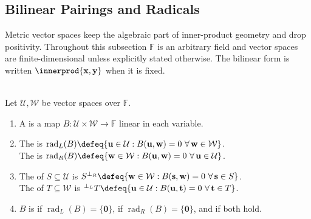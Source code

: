 \subsection{Bilinear Pairings and Radicals}\label{subsec:metric-vector-spaces-and-bilinear-forms}

%

Metric vector spaces keep the algebraic part of inner-product geometry and drop positivity. Throughout this subsection $\mathbb{F}$ is an arbitrary field and vector spaces are finite-dimensional unless explicitly stated otherwise. The bilinear form is written $\innerprod{\mathbf{x},\mathbf{y}}$ when it is fixed.

\begin{definition} \label{def:bilinear-pairing-left-right-radicals} \\
Let $\mathcal{U},\mathcal{W}$ be vector spaces over $\mathbb{F}$.
\begin{enumerate}[label=(\roman*)]
\setlength{\itemsep}{0pt}
\item A  is a map $B:\mathcal{U}\times\mathcal{W}\to\mathbb{F}$ linear in each variable.
\item The  is $\operatorname{rad}_L(B)\defeq\{\mathbf{u}\in\mathcal{U}:B(\mathbf{u},\mathbf{w})=0\ \forall\,\mathbf{w}\in\mathcal{W}\}$.\\
The  is $\operatorname{rad}_R(B)\defeq\{\mathbf{w}\in\mathcal{W}:B(\mathbf{u},\mathbf{w})=0\ \forall\,\mathbf{u}\in\mathcal{U}\}$.
\item The  of $S\subseteq\mathcal{U}$ is $S^{\perp_R}\defeq\{\mathbf{w}\in\mathcal{W}:B(\mathbf{s},\mathbf{w})=0\ \forall\,\mathbf{s}\in S\}$.\\
The  of $T\subseteq\mathcal{W}$ is ${}^{\perp_L}T\defeq\{\mathbf{u}\in\mathcal{U}:B(\mathbf{u},\mathbf{t})=0\ \forall\,\mathbf{t}\in T\}$.
\item $B$ is  if $\operatorname{rad}_L(B)=\{\mathbf{0}\}$,  if $\operatorname{rad}_R(B)=\{\mathbf{0}\}$, and  if both hold.
\end{enumerate}
\end{definition}

